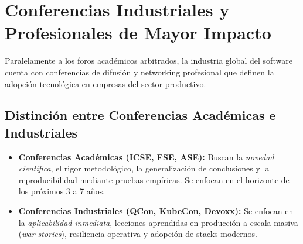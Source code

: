 \documentclass[12pt,a4paper]{article}
\begin{document}
\section{Conferencias Industriales y Profesionales de Mayor Impacto}

Paralelamente a los foros académicos arbitrados, la industria global del software cuenta con conferencias de difusión y networking profesional que definen la adopción tecnológica en empresas del sector productivo.

\subsection{Distinción entre Conferencias Académicas e Industriales}
\begin{itemize}[leftmargin=*]
    \item \textbf{Conferencias Académicas (ICSE, FSE, ASE):} Buscan la \textit{novedad científica}, el rigor metodológico, la generalización de conclusiones y la reproducibilidad mediante pruebas empíricas. Se enfocan en el horizonte de los próximos 3 a 7 años.
    \item \textbf{Conferencias Industriales (QCon, KubeCon, Devoxx):} Se enfocan en la \textit{aplicabilidad inmediata}, lecciones aprendidas en producción a escala masiva (\textit{war stories}), resiliencia operativa y adopción de stacks modernos.
\end{itemize}
\end{document}
